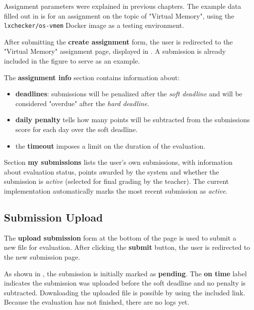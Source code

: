 Assignment parameters were explained in previous chapters. The example data filled out in  is for an assignment on the topic of "Virtual Memory", using the \texttt{lxchecker/os-vmem} Docker image as a testing environment.


After submitting the \textbf{create assignment} form, the user is redirected to the "Virtual Memory" assignment page, displayed in . A submission is already included in the figure to serve as an example.

The \textbf{assignment info} section contains information about:
\begin{itemize}
	\item \textbf{deadlines}: submissions will be penalized after the \textit{soft deadline} and will be considered "overdue" after the \textit{hard deadline}.
	\item \textbf{daily penalty} tells how many points will be subtracted from the submissions score for each day over the soft deadline.
	\item the \textbf{timeout} imposes a limit on the duration of the evaluation.
\end{itemize}

Section \textbf{my submissions} lists the user's own submissions, with information about evaluation status, points awarded by the system and whether the submission is \textit{active} (selected for final grading by the teacher). The current implementation automatically marks the most recent submission as \textit{active}.

\subsection{Submission Upload}
\label{sub-sec:usage-upload}

The \textbf{upload submission} form at the bottom of the page is used to submit a new file for evaluation. After clicking the \textbf{submit} button, the user is redirected to the new submission page.


As shown in , the submission is initially marked as \textbf{pending}. The \textbf{on time} label indicates the submission was uploaded before the soft deadline and no penalty is subtracted. Downloading the uploaded file is possible by using the included link. Because the evaluation has not finished, there are no logs yet.

